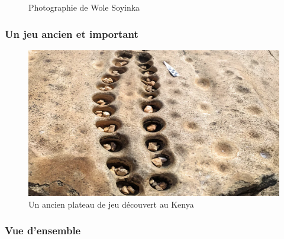 \documentclass{beamer}
\begin{document}
\begin{frame}
\begin{minipage}[b]{0.48\linewidth}
\begin{figure}
      \label{fig1}
      \caption{Photographie de Wole Soyinka}
    \end{figure}
  \end{minipage}
      
\end{frame}

\begin{frame}
  \frametitle{Un jeu ancien et important}
  \begin{figure}
    \centering
    \includegraphics[width=\linewidth]{ressources/ancien_plateau_jeu.png}
    \caption{Un ancien plateau de jeu découvert au Kenya}
  \end{figure}
\end{frame}


\begin{frame}
  \frametitle{Vue d'ensemble}
  \tableofcontents
\end{frame}
\end{document}
